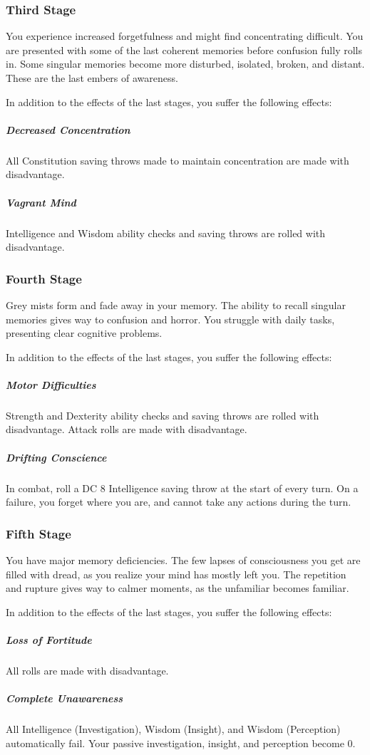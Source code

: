\subsubsection{Third Stage}
You experience increased forgetfulness and might find concentrating difficult.
You are presented with some of the last coherent memories before confusion fully rolls in.
Some singular memories become more disturbed, isolated, broken, and distant.
These are the last embers of awareness.

In addition to the effects of the last stages, you suffer the following effects:
\subparagraph{Decreased Concentration} All Constitution saving throws made to maintain concentration are made with disadvantage.
\subparagraph{Vagrant Mind} Intelligence and Wisdom ability checks and saving throws are rolled with disadvantage.

\subsubsection{Fourth Stage}
Grey mists form and fade away in your memory.
The ability to recall singular memories gives way to confusion and horror.
You struggle with daily tasks, presenting clear cognitive problems.

In addition to the effects of the last stages, you suffer the following effects:
\subparagraph{Motor Difficulties} Strength and Dexterity ability checks and saving throws are rolled with disadvantage.
Attack rolls are made with disadvantage.
\subparagraph{Drifting Conscience} In combat, roll a DC 8 Intelligence saving throw at the start of every turn.
On a failure, you forget where you are, and cannot take any actions during the turn.

\subsubsection{Fifth Stage}
You have major memory deficiencies.
The few lapses of consciousness you get are filled with dread, as you realize your mind has mostly left you.
The repetition and rupture gives way to calmer moments, as the unfamiliar becomes familiar.

In addition to the effects of the last stages, you suffer the following effects:
\subparagraph{Loss of Fortitude} All rolls are made with disadvantage.
\subparagraph{Complete Unawareness} All Intelligence (Investigation), Wisdom (Insight), and Wisdom (Perception) automatically fail.
Your passive investigation, insight, and perception become 0.

